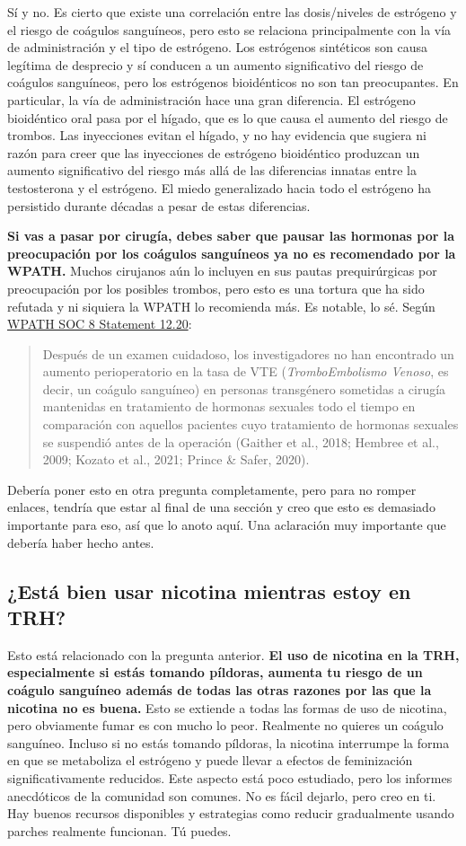 \documentclass{article}
\begin{document}
Sí y no. Es cierto que existe una correlación entre las dosis/niveles de estrógeno y el riesgo de coágulos sanguíneos, pero esto se relaciona principalmente con la vía de administración y el tipo de estrógeno. Los estrógenos sintéticos son causa legítima de desprecio y sí conducen a un aumento significativo del riesgo de coágulos sanguíneos, pero los estrógenos bioidénticos no son tan preocupantes. En particular, la vía de administración hace una gran diferencia. El estrógeno bioidéntico oral pasa por el hígado, que es lo que causa el aumento del riesgo de trombos. Las inyecciones evitan el hígado, y no hay evidencia que sugiera ni razón para creer que las inyecciones de estrógeno bioidéntico produzcan un aumento significativo del riesgo más allá de las diferencias innatas entre la testosterona y el estrógeno. El miedo generalizado hacia todo el estrógeno ha persistido durante décadas a pesar de estas diferencias.

\textbf{Si vas a pasar por cirugía, debes saber que pausar las hormonas por la preocupación por los coágulos sanguíneos ya no es recomendado por la WPATH.} Muchos cirujanos aún lo incluyen en sus pautas prequirúrgicas por preocupación por los posibles trombos, pero esto es una tortura que ha sido refutada y ni siquiera la WPATH lo recomienda más. Es notable, lo sé. Según \href{https://www.tandfonline.com/doi/pdf/10.1080/26895269.2022.2100644}{WPATH SOC 8 Statement 12.20}: \blockquote{Después de un examen cuidadoso, los investigadores no han encontrado un aumento perioperatorio en la tasa de VTE (\textit{TromboEmbolismo Venoso}, es decir, un coágulo sanguíneo) en personas transgénero sometidas a cirugía mantenidas en tratamiento de hormonas sexuales todo el tiempo en comparación con aquellos pacientes cuyo tratamiento de hormonas sexuales se suspendió antes de la operación (Gaither et al., 2018; Hembree et al., 2009; Kozato et al., 2021; Prince \& Safer, 2020).} Debería poner esto en otra pregunta completamente, pero para no romper enlaces, tendría que estar al final de una sección y creo que esto es demasiado importante para eso, así que lo anoto aquí. Una aclaración muy importante que debería haber hecho antes.  

\subsection{¿Está bien usar nicotina mientras estoy en TRH?}\label{11-2}

Esto está relacionado con la pregunta anterior. \textbf{El uso de nicotina en la TRH, especialmente si estás tomando píldoras, aumenta tu riesgo de un coágulo sanguíneo además de todas las otras razones por las que la nicotina no es buena.} Esto se extiende a todas las formas de uso de nicotina, pero obviamente fumar es con mucho lo peor. Realmente no quieres un coágulo sanguíneo. Incluso si no estás tomando píldoras, la nicotina interrumpe la forma en que se metaboliza el estrógeno y puede llevar a efectos de feminización significativamente reducidos. Este aspecto está poco estudiado, pero los informes anecdóticos de la comunidad son comunes. No es fácil dejarlo, pero creo en ti. Hay buenos recursos disponibles y estrategias como reducir gradualmente usando parches realmente funcionan. Tú puedes.
\end{document}
